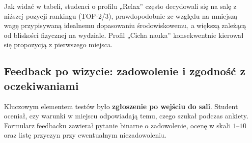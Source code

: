 \documentclass[14pt,a4paper]{extarticle}
\begin{document}
Jak widać w tabeli, studenci o profilu „Relax” często decydowali się na salę z niższej pozycji rankingu (TOP-2/3), prawdopodobnie ze względu na mniejszą wagę przypisywaną idealnemu dopasowaniu środowiskowemu, a większą zależącą od bliskości fizycznej na wydziale. Profil „Cicha nauka” konsekwentnie kierował się propozycją z pierwszego miejsca.

\subsection{Feedback po wizycie: zadowolenie i zgodność z oczekiwaniami}
Kluczowym elementem testów było \textbf{zgłoszenie po wejściu do sali}. Student oceniał, czy warunki w miejscu odpowiadają temu, czego szukał podczas ankiety. Formularz feedbacku zawierał pytanie binarne o zadowolenie, ocenę w skali $1$--$10$ oraz listę przyczyn przy ewentualnym niezadowoleniu.

\begin{table}[H]
    \centering
    \caption{Podsumowanie zadowolenia po wizycie w sali rekomendowanej przez aplikację.}
    \label{tab:zadowolenie}
\end{table}

\begin{table}[H]
    \centering
    \caption{Przyczyny zgłoszonego niezadowolenia (wielokrotny wybór; $N_{niezadow.} = 7$).}
    \label{tab:przyczyny}
\end{table}
\end{document}
